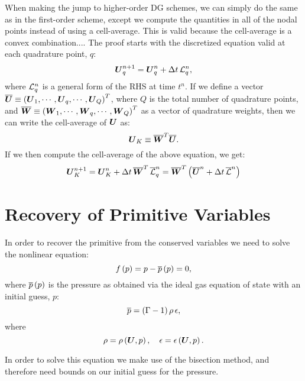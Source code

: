 \documentclass[10pt,preprint]{aastex}
\begin{document}
When making the jump to higher-order DG schemes, we can simply do the same as in the first-order scheme, except we compute the quantities in all of the nodal points instead of using a cell-average. This is valid because the cell-average is a convex combination.... The proof starts with the discretized equation valid at each quadrature point, $q$:
\begin{equation}
    \boldsymbol{U}_{q}^{n+1}=\boldsymbol{U}_{q}^{n}+\Delta t\,\mathcal{L}_{q}^{n},
\end{equation}
where $\mathcal{L}_{q}^{n}$ is a general form of the RHS at time $t^{n}$. If we define a vector $\overline{\boldsymbol{U}}\equiv\left(\boldsymbol{U}_{1},\cdots,\boldsymbol{U}_{q},\cdots,\boldsymbol{U}_{Q}\right)^T$, where $Q$ is the total number of quadrature points, and $\overline{\boldsymbol{W}}\equiv\left(\boldsymbol{W}_{1},\cdots,\boldsymbol{W}_{q},\cdots,\boldsymbol{W}_{Q}\right)^T$ as a vector of quadrature weights, then we can write the cell-average of $\boldsymbol{U}$ as:
\begin{equation}
    \boldsymbol{U}_{K}\equiv\overline{\boldsymbol{W}}^T\overline{\boldsymbol{U}}.
\end{equation}
If we then compute the cell-average of the above equation, we get:
\begin{equation}
    \boldsymbol{U}_{K}^{n+1}=\boldsymbol{U}_{K}^{n}+\Delta t\,\overline{\boldsymbol{W}}^{T}\,\overline{\mathcal{L}}_{q}^{n}=\overline{\boldsymbol{W}}^{T}\left(\overline{\boldsymbol{U}}^{n}+\Delta t\,\overline{\mathcal{L}}^{n}\right)
\end{equation}

\newpage
\section{Recovery of Primitive Variables}
In order to recover the primitive from the conserved variables we need to solve the nonlinear equation:
\begin{equation}
    f\left(p\right)=p-\overline{p}\left(p\right)=0,
\end{equation}
where $\overline{p}\left(p\right)$ is the pressure as obtained via the ideal gas equation of state with an initial guess, $p$:
\begin{equation}
    \overline{p}=\left(\Gamma-1\right)\rho\,\epsilon,
\end{equation}
where
\begin{equation}
    \rho=\rho\left(\boldsymbol{U},p\right),\hspace{1em}\epsilon=\epsilon\left(\boldsymbol{U},p\right).
\end{equation}

In order to solve this equation we make use of the bisection method, and therefore need bounds on our initial guess for the pressure.
\end{document}
